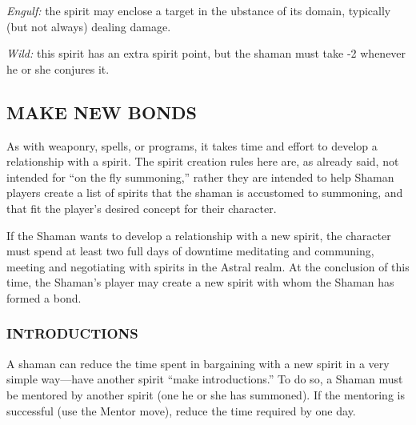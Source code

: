 \documentclass[oneside,10pt]{article}
\begin{document}
\begin{multicols}{2}
\begin{adjustwidth*}{.5cm}{.5cm}
\textit{Engulf:} the spirit may enclose a target in the ubstance of its
domain, typically (but not always) dealing damage.

\textit{Wild:} this spirit has an extra spirit point, but the shaman
must take -2 whenever he or she conjures it.
\end{adjustwidth*}
\subsection{MAKE NEW BONDS}
As with weaponry, spells, or programs, it takes time and effort to develop a relationship with a spirit. The spirit creation
rules here are, as already said, not intended for “on the fly
summoning,” rather they are intended to help Shaman players create a list of spirits that the shaman is accustomed to
summoning, and that fit the player’s desired concept for their
character.

If the Shaman wants to develop a relationship with a new
spirit, the character must spend at least two full days of
downtime meditating and communing, meeting and negotiating with spirits in the Astral realm. At the conclusion of this
time, the Shaman’s player may create a new spirit with whom
the Shaman has formed a bond.

\subsubsection{INTRODUCTIONS}
A shaman can reduce the time spent in bargaining with a
new spirit in a very simple way—have another spirit “make
introductions.” To do so, a Shaman must be mentored by another spirit (one he or she has summoned). If the mentoring
is successful (use the Mentor move), reduce the time required
by one day.

\end{multicols}

\end{document}

